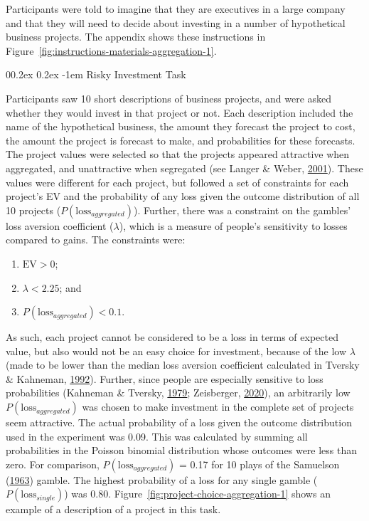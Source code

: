 \documentclass[
  english,
  man, donotrepeattitle,floatsintext]{apa7}
\makeatletter
\let\oldparagraph\paragraph
\renewcommand{\paragraph}[1]{\oldparagraph{#1}\mbox{}}
\renewcommand{\paragraph}{\@startsection{paragraph}{4}{\parindent}%
  {0\baselineskip \@plus 0.2ex \@minus 0.2ex}%
  {-1em}%
  {\normalfont\normalsize\bfseries\itshape\typesectitle}}
\theoremstyle{definition}
\theoremstyle{definition}
\theoremstyle{definition}
\theoremstyle{definition}
\theoremstyle{remark}
\makeatother
\begin{document}
Participants were told to imagine that they are executives in a large company
and that they will need to decide about investing in a number of hypothetical
business projects. The appendix shows these instructions in
Figure~\ref{fig:instructions-materials-aggregation-1}.

\hypertarget{task-aggregation-1}{%
\paragraph{Risky Investment Task}\label{task-aggregation-1}}

Participants saw 10 short descriptions of business projects, and were asked
whether they would invest in that project or not. Each description included the
name of the hypothetical business, the amount they forecast the project to cost,
the amount the project is forecast to make, and probabilities for these
forecasts. The project values were selected so that the projects appeared
attractive when aggregated, and unattractive when segregated (see Langer \& Weber, \protect\hyperlink{ref-langer2001}{2001}).
These values were different for each project, but followed a set of constraints
for each project's EV and the probability of any loss given the outcome
distribution of all 10 projects (\(P(\text{loss}_{aggregated})\)). Further, there
was a constraint on the gambles' loss aversion coefficient (\(\lambda\)), which is
a measure of people's sensitivity to losses compared to gains. The constraints
were:

\begin{enumerate}
\def\labelenumi{\arabic{enumi}.}
\item
  \(\text{EV} > 0\);
\item
  \(\lambda < 2.25\); and
\item
  \(P(\text{loss}_{aggregated}) < 0.1\).
\end{enumerate}

As such, each project cannot be considered to be a loss in terms of expected
value, but also would not be an easy choice for investment, because of the low
\(\lambda\) (made to be lower than the median loss aversion coefficient calculated
in Tversky \& Kahneman, \protect\hyperlink{ref-tversky1992}{1992}). Further, since people are especially sensitive to loss
probabilities (Kahneman \& Tversky, \protect\hyperlink{ref-kahneman1979}{1979}; Zeisberger, \protect\hyperlink{ref-zeisberger2020}{2020}), an arbitrarily low
\(P(\text{loss}_{aggregated})\) was chosen to make investment in the complete set
of projects seem attractive. The actual probability of a loss given the outcome
distribution used in the experiment was 0.09.
This was calculated by summing all probabilities in the Poisson binomial
distribution whose outcomes were less than zero. For comparison,
\(P(\text{loss}_{aggregated})\) = 0.17
for 10 plays of the Samuelson (\protect\hyperlink{ref-samuelson1963}{1963}) gamble. The highest probability of a loss for
any single gamble (\(P(\text{loss}_{single})\)) was
0.80.
Figure~\ref{fig:project-choice-aggregation-1} shows an example of a description
of a project in this task.
\end{document}

